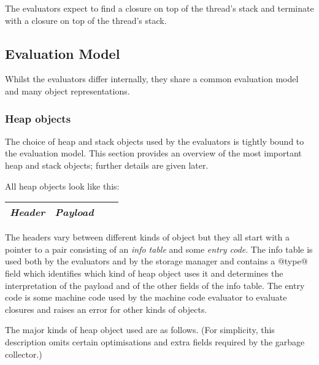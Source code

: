 \documentclass[11pt]{article}
\newcommand{\Subsection}[2]{\subsection{#1}\label{sec:#2}}
\newcommand{\Subsubsection}[2]{\subsubsection{#1}\label{sec:#2}}
\begin{document}
The evaluators expect to find a closure on top of the thread's stack
and terminate with a closure on top of the thread's stack.

\Subsection{Evaluation Model}{evaluation-model}

Whilst the evaluators differ internally, they share a common
evaluation model and many object representations.

\Subsubsection{Heap objects}{heap-objects-overview}

The choice of heap and stack objects used by the evaluators is tightly
bound to the evaluation model.  This section provides an overview of
the most important heap and stack objects; further details are given
later.

All heap objects look like this:

\begin{center}
\begin{tabular}{|l|l|l|l|}\hline
\emph{Header} & \emph{Payload} \\ \hline
\end{tabular}
\end{center}

The headers vary between different kinds of object but they all start
with a pointer to a pair consisting of an \emph{info table} and some
\emph{entry code}.  The info table is used both by the evaluators and
by the storage manager and contains a @type@ field which identifies
which kind of heap object uses it and determines the interpretation of
the payload and of the other fields of the info table.  The entry code
is some machine code used by the machine code evaluator to evaluate
closures and raises an error for other kinds of objects.

The major kinds of heap object used are as follows.  (For simplicity,
this description omits certain optimisations and extra fields required
by the garbage collector.)
\end{document}

